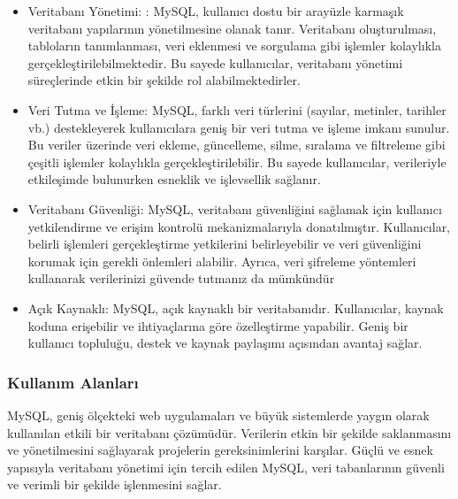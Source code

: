 \begin{itemize}
\item Veritabanı Yönetimi: : MySQL, kullanıcı dostu bir arayüzle karmaşık veritabanı yapılarının yönetilmesine olanak tanır. Veritabanı oluşturulması, tabloların tanımlanması, veri eklenmesi ve sorgulama gibi işlemler kolaylıkla gerçekleştirilebilmektedir. Bu sayede kullanıcılar, veritabanı yönetimi süreçlerinde etkin bir şekilde rol alabilmektedirler.

\item Veri Tutma ve İşleme: MySQL, farklı veri türlerini (sayılar, metinler, tarihler vb.) destekleyerek kullanıcılara geniş bir veri tutma ve işleme imkanı sunulur. Bu veriler üzerinde veri ekleme, güncelleme, silme, sıralama ve filtreleme gibi çeşitli işlemler kolaylıkla gerçekleştirilebilir. Bu sayede kullanıcılar, verileriyle etkileşimde bulunurken esneklik ve işlevsellik sağlanır.

\item Veritabanı Güvenliği: MySQL, veritabanı güvenliğini sağlamak için kullanıcı yetkilendirme ve erişim kontrolü mekanizmalarıyla donatılmıştır. Kullanıcılar, belirli işlemleri gerçekleştirme yetkilerini belirleyebilir ve veri güvenliğini korumak için gerekli önlemleri alabilir. Ayrıca, veri şifreleme yöntemleri kullanarak verilerinizi güvende tutmanız da mümkündür

\item Açık Kaynaklı: MySQL, açık kaynaklı bir veritabanıdır. Kullanıcılar, kaynak koduna erişebilir ve ihtiyaçlarına göre özelleştirme yapabilir. Geniş bir kullanıcı topluluğu, destek ve kaynak paylaşımı açısından avantaj sağlar.
\end{itemize}

\subsubsection{Kullanım Alanları}
MySQL, geniş ölçekteki web uygulamaları ve büyük sistemlerde yaygın olarak kullanılan etkili bir veritabanı çözümüdür. Verilerin etkin bir şekilde saklanmasını ve yönetilmesini sağlayarak projelerin gereksinimlerini karşılar. Güçlü ve esnek yapısıyla veritabanı yönetimi için tercih edilen MySQL, veri tabanlarının güvenli ve verimli bir şekilde işlenmesini sağlar.
